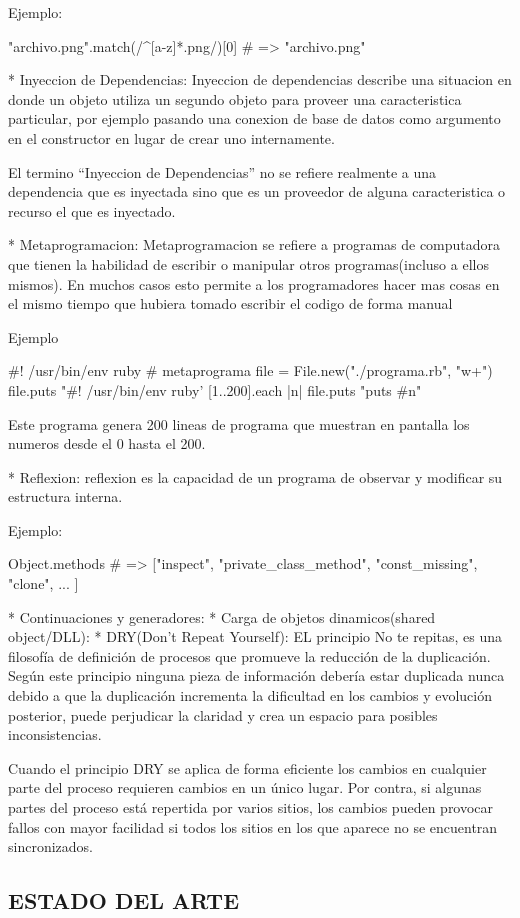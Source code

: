 Ejemplo:

\begin{verbatim*}
"archivo.png".match(/^[a-z]*.png/)[0]
# => "archivo.png"
\end{verbatim*}

* Inyeccion de Dependencias: Inyeccion de dependencias describe una situacion en donde un
objeto utiliza un segundo objeto para proveer una caracteristica particular, por ejemplo 
pasando una conexion de base de datos como argumento en el constructor en lugar de crear
uno internamente.

El termino ``Inyeccion de Dependencias'' no se refiere realmente a una dependencia que es
inyectada sino que es un proveedor de alguna caracteristica o recurso el que es
inyectado.

* Metaprogramacion: Metaprogramacion se refiere a programas de computadora que tienen
la habilidad de escribir o manipular otros programas(incluso a ellos mismos). En muchos
casos esto permite a los programadores hacer mas cosas en el mismo tiempo que hubiera
tomado escribir el codigo de forma manual

Ejemplo

\begin{verbatim*}
#! /usr/bin/env ruby
# metaprograma
file = File.new("./programa.rb", "w+")
file.puts "#! /usr/bin/env ruby'
[1..200].each { |n| file.puts "puts #{n}" }
\end{verbatim*}

Este programa genera 200 lineas de programa que muestran en pantalla los numeros desde
el 0 hasta el 200.

* Reflexion: reflexion es la capacidad de un programa de observar y modificar su estructura interna.

Ejemplo:

\begin{verbatim*}
Object.methods
# => ["inspect", "private_class_method", "const_missing", "clone", ... ]
\end{verbatim*}

* Continuaciones y generadores: 
* Carga de objetos dinamicos(shared object/DLL): 
* DRY(Don't Repeat Yourself): EL principio No te repitas, es una filosofía de definición de procesos que promueve la reducción de la duplicación.
Según este principio ninguna pieza de información debería estar duplicada nunca debido a que la duplicación incrementa la dificultad en los cambios y evolución posterior, puede perjudicar la claridad y crea un espacio para posibles inconsistencias.

Cuando el principio DRY se aplica de forma eficiente los cambios en cualquier parte del proceso requieren cambios en un único lugar. Por contra, si algunas partes del proceso está repertida por varios sitios, los cambios pueden provocar fallos con mayor facilidad si todos los sitios en los que aparece no se encuentran sincronizados.





\subsection{ESTADO DEL ARTE}
